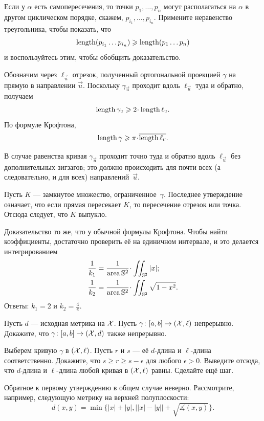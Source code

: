 \begin{multicols}{2}
Если у $\alpha$ есть самопересечения, то точки $p_1,\dots, p_n$ могут располагаться на $\alpha$ в другом циклическом порядке, скажем, $p_{i_1},\dots,p_{i_n}$.
Примените неравенство треугольника, чтобы показать, что
\[\mathop{\rm length}\nolimits(p_{i_1}\dots p_{i_n})\geqslant \mathop{\rm length}\nolimits (p_1\dots p_n)\]
и воспользуйтесь этим, чтобы обобщить доказательство.

Обозначим через $\ell_{\vec u}$ отрезок, 
полученный ортогональной проекцией $\gamma$ на прямую в направлении ${\vec u}$.
Поскольку $\gamma_{\vec u}$ проходит вдоль $\ell_{\vec u}$ туда и обратно, получаем
\[\length\gamma_{\vec u}\ge 2\cdot\length\ell_{\vec u}.\]
По формуле Крофтона, 
\[\length\gamma\ge \pi\cdot \overline{\length\ell_{\vec u}}.\]

В случае равенства кривая $\gamma_{\vec u}$ проходит точно туда и обратно вдоль $\ell_{\vec u}$ без дополнительных зигзагов;
это должно происходить для почти всех (а следовательно, и для всех) направлений~${\vec u}$.

Пусть $K$ --- замкнутое множество, ограниченное~$\gamma$.
Последнее утверждение означает, что если прямая пересекает $K$, то пересечение отрезок или точка.
Отсюда следует, что $K$ выпукло.

Доказательство то же, что у обычной формулы Крофтона.
Чтобы найти коэффициенты, достаточно проверить её на единичном интервале,
и это делается интегрированием
\begin{align*}
\frac1{k_1}&=\frac{1}{\area \mathbb{S}^2}\cdot\iint_{\mathbb{S}^2} |x|;
\\
\frac1{k_2}&=\frac{1}{\area \mathbb{S}^2}\cdot\iint_{\mathbb{S}^2} \sqrt{1-x^2}.
\end{align*}
Ответы: $k_1=2$ и $k_2=\tfrac4\pi$.

Пусть $d$ — исходная метрика на $\mathcal{X}$.
Пусть $\gamma\colon[a,b]\to (\mathcal{X},\ell)$ непрерывно.
Докажите, что $\gamma\colon[a,b]\to (\mathcal{X},d)$ также непрерывно.

Выберем кривую $\gamma$ в $(\mathcal{X},\ell)$.
Пусть $r$ и $s$ --- её $d$-длина и $\ell$-длина соответственно.
Докажите, что $s\ge r\ge s-\epsilon$ для любого $\epsilon>0$.
Выведите отсюда, что $d$-длина и $\ell$-длина любой кривая в $(\mathcal{X},\ell)$ равны.
Сделайте ещё шаг.

 Обратное к первому утверждению в общем случае неверно.
Рассмотрите, например, следующую метрику на верхней полуплоскости:
\[d(x,y)=\min\{|x|+|y|,\bigl||x|-|y|\bigr|+\sqrt{\measuredangle(x,y)}\}.\]


\end{multicols}
